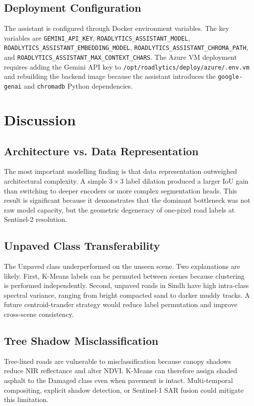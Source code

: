 ﻿\documentclass[conference]{IEEEtran}
\begin{document}
\subsection{Deployment Configuration}
The assistant is configured through Docker environment variables. The key variables are \texttt{GEMINI\_API\_KEY}, \texttt{ROADLYTICS\_ASSISTANT\_MODEL}, \texttt{ROADLYTICS\_ASSISTANT\_EMBEDDING\_MODEL}, \texttt{ROADLYTICS\_ASSISTANT\_CHROMA\_PATH}, and \texttt{ROADLYTICS\_ASSISTANT\_MAX\_CONTEXT\_CHARS}. The Azure VM deployment requires adding the Gemini API key to \texttt{/opt/roadlytics/deploy/azure/.env.vm} and rebuilding the backend image because the assistant introduces the \texttt{google-genai} and \texttt{chromadb} Python dependencies.

\section{Discussion}
\subsection{Architecture vs. Data Representation}
The most important modelling finding is that data representation outweighed architectural complexity. A simple $3\times3$ label dilation produced a larger IoU gain than switching to deeper encoders or more complex segmentation heads. This result is significant because it demonstrates that the dominant bottleneck was not raw model capacity, but the geometric degeneracy of one-pixel road labels at Sentinel-2 resolution.

\subsection{Unpaved Class Transferability}
The Unpaved class underperformed on the unseen scene. Two explanations are likely. First, K-Means labels can be permuted between scenes because clustering is performed independently. Second, unpaved roads in Sindh have high intra-class spectral variance, ranging from bright compacted sand to darker muddy tracks. A future centroid-transfer strategy would reduce label permutation and improve cross-scene consistency.

\subsection{Tree Shadow Misclassification}
Tree-lined roads are vulnerable to misclassification because canopy shadows reduce NIR reflectance and alter NDVI. K-Means can therefore assign shaded asphalt to the Damaged class even when pavement is intact. Multi-temporal compositing, explicit shadow detection, or Sentinel-1 SAR fusion could mitigate this limitation.
\end{document}

